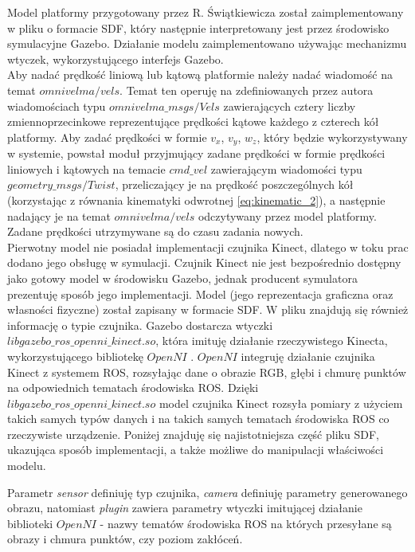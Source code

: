 Model platformy przygotowany przez R. Świątkiewicza \cite{omnivelma} został zaimplementowany w pliku o formacie SDF, który następnie interpretowany jest przez środowisko symulacyjne Gazebo. Działanie modelu zaimplementowano używając mechanizmu wtyczek, wykorzystującego interfejs Gazebo.\\

Aby nadać prędkość liniową lub kątową platformie należy nadać wiadomość na temat $omnivelma/vels$. Temat ten operuję na zdefiniowanych przez autora wiadomościach typu $omnivelma\_msgs/Vels$ zawierających cztery liczby zmiennoprzecinkowe reprezentujące prędkości kątowe każdego z czterech kół platformy. Aby zadać prędkości w formie $v_{x}$, $v_{y}$, $w_{z}$, który będzie wykorzystywany w systemie, powstał moduł przyjmujący zadane prędkości w formie prędkości liniowych i kątowych na temacie $cmd\_vel$ zawierającym wiadomości typu $geometry\_msgs/Twist$, przeliczający je na prędkość poszczególnych kół (korzystając z równania kinematyki odwrotnej \eqref{eq:kinematic_2}), a następnie nadający je na temat $omnivelma/vels$ odczytywany przez model platformy. Zadane prędkości utrzymywane są do czasu zadania nowych.\\

Pierwotny model nie posiadał implementacji czujnika Kinect, dlatego w toku prac dodano jego obsługę w symulacji. Czujnik Kinect nie jest bezpośrednio dostępny jako gotowy model w środowisku Gazebo, jednak producent symulatora \cite{gazebo_kinect} prezentuję sposób jego implementacji. Model (jego reprezentacja graficzna oraz własności fizyczne) został zapisany w formacie SDF. W pliku znajdują się również informację o typie czujnika. Gazebo dostarcza wtyczki $libgazebo\_ros\_openni\_kinect.so$, która imituję działanie rzeczywistego Kinecta, wykorzystującego bibliotekę $OpenNI$ \cite{openni}. $OpenNI$ integruję działanie czujnika Kinect z systemem ROS, rozsyłając dane o obrazie RGB, głębi i chmurę punktów na odpowiednich tematach środowiska ROS. Dzięki $libgazebo\_ros\_openni\_kinect.so$ model czujnika Kinect rozsyła pomiary z użyciem takich samych typów danych i na takich samych tematach środowiska ROS co rzeczywiste urządzenie. Poniżej znajduję się najistotniejsza część pliku SDF, ukazująca sposób implementacji, a także możliwe do manipulacji właściwości modelu.

    
    
Parametr \textit{sensor} definiuję typ czujnika, \textit{camera} definiuję parametry generowanego obrazu, natomiast \textit{plugin} zawiera parametry wtyczki imitującej działanie biblioteki $OpenNI$ - nazwy tematów środowiska ROS na których przesyłane są obrazy i chmura punktów, czy poziom zakłóceń.

